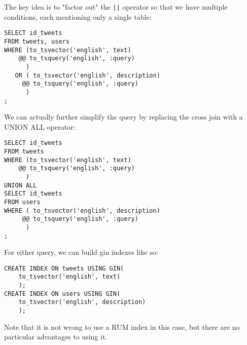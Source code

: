\documentclass[12pt]{exam}
\theoremstyle{definition}
\begin{document}
\begin{questions}
\begin{enumerate}[a.]
        \begin{solution}
            The key idea is to "factor out" the \lstinline{||} operator so that we have multiple conditions, each mentioning only a single table:
\begin{lstlisting}
SELECT id_tweets
FROM tweets, users
WHERE (to_tsvector('english', text) 
    @@ to_tsquery('english', :query)
      )
   OR ( to_tsvector('english', description)
     @@ to_tsquery('english', :query)
      )
;
\end{lstlisting}
We can actually further simplify the query by replacing the cross join with a UNION ALL operator:
\begin{lstlisting}
SELECT id_tweets
FROM tweets
WHERE (to_tsvector('english', text) 
    @@ to_tsquery('english', :query)
      )
UNION ALL
SELECT id_tweets
FROM users
WHERE ( to_tsvector('english', description)
     @@ to_tsquery('english', :query)
      )
;
\end{lstlisting}
For either query, we can build gin indexes like so:
\begin{lstlisting}
CREATE INDEX ON tweets USING GIN(
    to_tsvector('english', text)
    );
CREATE INDEX ON users USING GIN(
    to_tsvector('english', description)
    );
\end{lstlisting}
Note that it is not wrong to use a RUM index in this case, but there are no particular advantages to using it.
        \end{solution}
\end{enumerate}

\end{questions}
\end{document}
